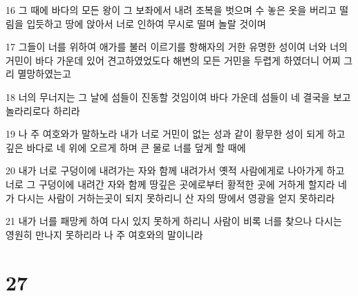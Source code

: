 \par 16 그 때에 바다의 모든 왕이 그 보좌에서 내려 조복을 벗으며 수 놓은 옷을 버리고 떨림을 입듯하고 땅에 앉아서 너로 인하여 무시로 떨며 놀랄 것이며
\par 17 그들이 너를 위하여 애가를 불러 이르기를 항해자의 거한 유명한 성이여 너와 너의 거민이 바다 가운데 있어 견고하였었도다 해변의 모든 거민을 두렵게 하였더니 어찌 그리 멸망하였는고
\par 18 너의 무너지는 그 날에 섬들이 진동할 것임이여 바다 가운데 섬들이 네 결국을 보고 놀라리로다 하리라
\par 19 나 주 여호와가 말하노라 내가 너로 거민이 없는 성과 같이 황무한 성이 되게 하고 깊은 바다로 네 위에 오르게 하며 큰 물로 너를 덮게 할 때에
\par 20 내가 너로 구덩이에 내려가는 자와 함께 내려가서 옛적 사람에게로 나아가게 하고 너로 그 구덩이에 내려간 자와 함께 땅깊은 곳에로부터 황적한 곳에 거하게 할지라 네가 다시는 사람이 거하는곳이 되지 못하리니 산 자의 땅에서 영광을 얻지 못하리라
\par 21 내가 너를 패망케 하여 다시 있지 못하게 하리니 사람이 비록 너를 찾으나 다시는 영원히 만나지 못하리라 나 주 여호와의 말이니라

\chapter{27}


